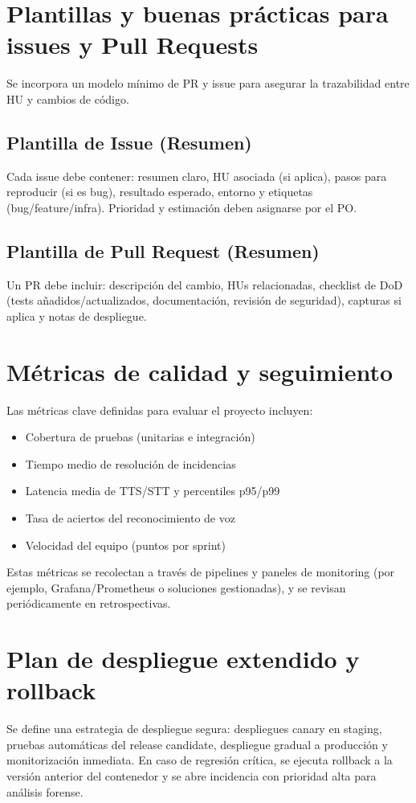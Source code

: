 \documentclass[12pt]{article}
\begin{document}
\section{Plantillas y buenas prácticas para issues y Pull Requests}
Se incorpora un modelo mínimo de PR y issue para asegurar la trazabilidad entre HU y cambios de código.

\subsection{Plantilla de Issue (Resumen)}
Cada issue debe contener: resumen claro, HU asociada (si aplica), pasos para reproducir (si es bug), resultado esperado, entorno y etiquetas (bug/feature/infra). Prioridad y estimación deben asignarse por el PO.

\subsection{Plantilla de Pull Request (Resumen)}
Un PR debe incluir: descripción del cambio, HUs relacionadas, checklist de DoD (tests añadidos/actualizados, documentación, revisión de seguridad), capturas si aplica y notas de despliegue.

\section{Métricas de calidad y seguimiento}
Las métricas clave definidas para evaluar el proyecto incluyen:
\begin{itemize}
  \item Cobertura de pruebas (unitarias e integración)
  \item Tiempo medio de resolución de incidencias
  \item Latencia media de TTS/STT y percentiles p95/p99
  \item Tasa de aciertos del reconocimiento de voz
  \item Velocidad del equipo (puntos por sprint)
\end{itemize}

Estas métricas se recolectan a través de pipelines y paneles de monitoring (por ejemplo, Grafana/Prometheus o soluciones gestionadas), y se revisan periódicamente en retrospectivas.

\section{Plan de despliegue extendido y rollback}
Se define una estrategia de despliegue segura: despliegues canary en staging, pruebas automáticas del release candidate, despliegue gradual a producción y monitorización inmediata. En caso de regresión crítica, se ejecuta rollback a la versión anterior del contenedor y se abre incidencia con prioridad alta para análisis forense.
\end{document}
